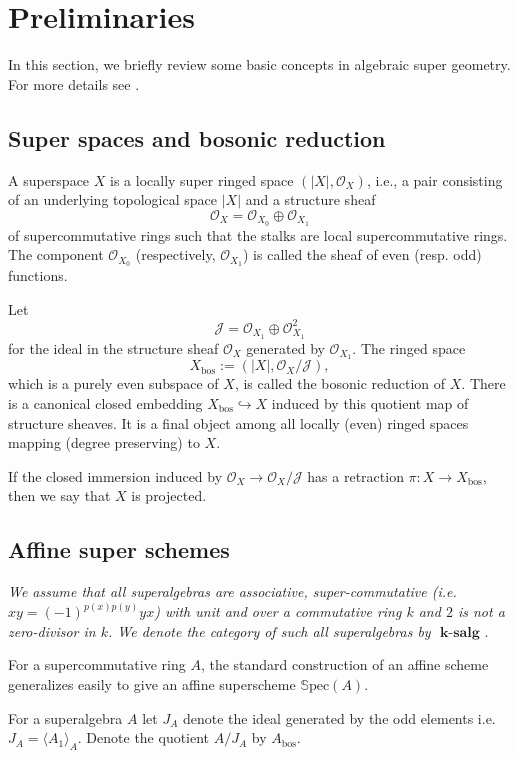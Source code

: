 \documentclass[12pt, reqno]{amsart}
\theoremstyle{plain}
\numberwithin{equation}{section}
\newcommand{\salg} {\textbf{ k-salg }}
\newcommand{\mc}[1]{\mathcal{#1}}
\newcommand{\stsheaf}[1]{\mathcal{O}_{#1}}
\newcommand{\est}[1]{\mathcal{O}_{{#1}_0}}
\newcommand{\ost}[1]{\mathcal{O}_{{#1}_1}}
\newcommand{\Spec}[1]{\mathbb{S}\mathrm{pec}(#1)}
\begin{document}
\section{Preliminaries}
In this section, we briefly review some basic concepts in algebraic super geometry. For more details see \cite{BR21, BRP, CN, CCF, Ma88a, MZ22, OV23, We09}.

\subsection{Super spaces and bosonic reduction}
A superspace $X$ is a locally super ringed space $(|X|, \stsheaf{X})$, 
i.e., a pair consisting of an underlying  topological space $|X|$ and a structure 
sheaf 
$$\stsheaf{X} = \est{X} \oplus \ost{X}$$
of supercommutative rings such that the stalks are local 
supercommutative rings. The component
$\est{X}$ (respectively, $\ost{X}$) is called the sheaf 
of even (resp. odd) functions.

Let $$\mc{J} = \ost{X} \oplus \ost{X}^2$$ for
the ideal in the structure sheaf $\stsheaf{X}$ generated by 
$\ost{X}$. The ringed space 
$$X_{\mathrm{bos}} := (|X|, \stsheaf{X}/\mc{J}),$$
which is a purely even subspace of $X$, is called the bosonic 
reduction of $X$. 
There is a canonical closed embedding $X_{\mathrm{bos}} \hookrightarrow X$ induced by this quotient map of structure sheaves. It is a final object among all locally (even)  ringed spaces mapping (degree preserving) to $X$. 

If the closed immersion 
induced by $\stsheaf{X}\rightarrow \stsheaf{X}/\mathcal{J}$ has 
a retraction $\pi : X \rightarrow X_\mathrm{bos}$, then we say 
that $X$ is projected.

\subsection{Affine super schemes}
\textit{We assume that all superalgebras are associative, super-commutative 
(i.e. $xy=(-1)^{p(x)p(y)} yx$) with unit and over a commutative ring $k$ and $2$ is not a zero-divisor in $k$.
We denote the category of such all superalgebras by} $\salg$.

For a supercommutative ring $A$, the standard construction of an affine scheme generalizes easily to give an affine superscheme 
$\Spec{A}$.

For a superalgebra $A$ let
$J_A$ denote the ideal generated by the odd elements i.e. $J_A= \langle A_1 \rangle_A$.
Denote the quotient $A/J_A$ by $A_\mathrm{bos}$.
\end{document}
